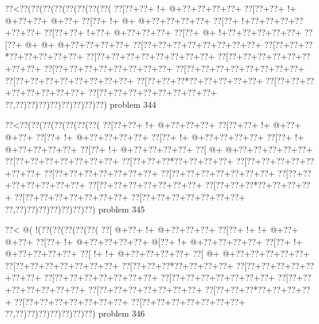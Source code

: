 \vbox{\vbox{\goo
\0??<\0??(\0??(\0??(\0??(\0??(\0??(\0??(\0??(
\0??[\0??+\0??+\- !+\- @+\0??+\0??+\0??+\0??+
\0??[\0??+\0??+\- !+\- @+\0??+\0??+\- @+\0??+
\0??[\0??+\- !+\- @+\- @+\0??+\0??+\0??+\0??+
\0??[\0??+\- !+\0??+\0??+\0??+\0??+\0??+\0??+
\0??[\0??+\0??+\- !+\0??+\- @+\0??+\0??+\0??+
\0??[\0??+\- @+\- !+\0??+\0??+\0??+\0??+\0??+
\0??[\0??+\- @+\- @+\- @+\0??+\0??+\0??+\0??+
\0??[\0??+\0??+\0??+\0??+\0??+\0??+\0??+\0??+
\0??[\0??+\0??+\0??*\0??+\0??+\0??+\0??+\0??+
\0??[\0??+\0??+\0??+\0??+\0??+\0??+\0??+\0??+
\0??[\0??+\0??+\0??+\0??+\0??+\0??+\0??+\0??+
\0??[\0??+\0??+\0??+\0??+\0??+\0??+\0??+\0??+
\0??[\0??+\0??+\0??+\0??+\0??+\0??+\0??+\0??+
\0??[\0??+\0??+\0??+\0??+\0??+\0??+\0??+\0??+
\0??[\0??+\0??+\0??*\0??+\0??+\0??+\0??+\0??+
\0??[\0??+\0??+\0??+\0??+\0??+\0??+\0??+\0??+
\0??[\0??+\0??+\0??+\0??+\0??+\0??+\0??+\0??+
\0??,\0??)\0??)\0??)\0??)\0??)\0??)\0??)\0??)
}
\hfil problem 344\hfil\break
}

\vbox{\vbox{\goo
\0??<\0??(\0??(\0??(\0??(\0??(\0??(\0??(
\0??[\0??+\0??+\- !+\- @+\0??+\0??+\0??+
\0??[\0??+\0??+\- !+\- @+\0??+\- @+\0??+
\0??[\0??+\- !+\- @+\0??+\0??+\0??+\0??+
\0??[\0??+\- !+\- @+\0??+\0??+\0??+\0??+
\0??[\0??+\- !+\- @+\0??+\0??+\0??+\0??+
\0??[\0??+\- !+\- @+\0??+\0??+\0??+\0??+
\0??[\- @+\- @+\0??+\0??+\0??+\0??+\0??+
\0??[\0??+\0??+\0??+\0??+\0??+\0??+\0??+
\0??[\0??+\0??+\0??*\0??+\0??+\0??+\0??+
\0??[\0??+\0??+\0??+\0??+\0??+\0??+\0??+
\0??[\0??+\0??+\0??+\0??+\0??+\0??+\0??+
\0??[\0??+\0??+\0??+\0??+\0??+\0??+\0??+
\0??[\0??+\0??+\0??+\0??+\0??+\0??+\0??+
\0??[\0??+\0??+\0??+\0??+\0??+\0??+\0??+
\0??[\0??+\0??+\0??*\0??+\0??+\0??+\0??+
\0??[\0??+\0??+\0??+\0??+\0??+\0??+\0??+
\0??[\0??+\0??+\0??+\0??+\0??+\0??+\0??+
\0??,\0??)\0??)\0??)\0??)\0??)\0??)\0??)
}
\hfil problem 345\hfil\break
}

\vbox{\vbox{\goo
\0??<\- @(\- !(\0??(\0??(\0??(\0??(\0??(
\0??[\- @+\0??+\- !+\- @+\0??+\0??+\0??+
\0??[\0??+\- !+\- !+\- @+\0??+\- @+\0??+
\0??[\0??+\- !+\- @+\0??+\0??+\0??+\0??+
\- @[\0??+\- !+\- @+\0??+\0??+\0??+\0??+
\0??[\0??+\- !+\- @+\0??+\0??+\0??+\0??+
\0??[\- !+\- !+\- @+\0??+\0??+\0??+\0??+
\0??[\- @+\- @+\0??+\0??+\0??+\0??+\0??+
\0??[\0??+\0??+\0??+\0??+\0??+\0??+\0??+
\0??[\0??+\0??+\0??*\0??+\0??+\0??+\0??+
\0??[\0??+\0??+\0??+\0??+\0??+\0??+\0??+
\0??[\0??+\0??+\0??+\0??+\0??+\0??+\0??+
\0??[\0??+\0??+\0??+\0??+\0??+\0??+\0??+
\0??[\0??+\0??+\0??+\0??+\0??+\0??+\0??+
\0??[\0??+\0??+\0??+\0??+\0??+\0??+\0??+
\0??[\0??+\0??+\0??*\0??+\0??+\0??+\0??+
\0??[\0??+\0??+\0??+\0??+\0??+\0??+\0??+
\0??[\0??+\0??+\0??+\0??+\0??+\0??+\0??+
\0??,\0??)\0??)\0??)\0??)\0??)\0??)\0??)
}
\hfil problem 346\hfil\break
}

